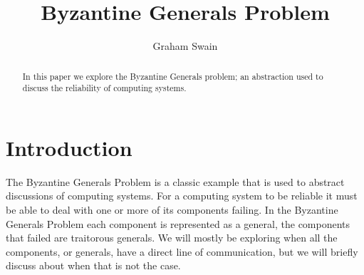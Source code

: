 \documentclass[10pt]{amsart}
\begin{document}
\parskip10pt
\parindent12pt
\baselineskip16pt


\def\G{\widetilde{G}}
\def\B{\widetilde{B}}
\def\T{\widetilde{T}}
\def\C{\mathbb{C}}
\def\A{\mathbb{A}}
\def\Z{\mathbb{Z}}
\def\R{\mathbb{R}}
\def\Q{\mathbb{Q}}
\def\N{\mathbb{N}}
\def\C{\mathbb{C}}
\def\F{\mathbb{F}}
\def\I{\mathbb{I}}
\def\H{\mathcal{H}}
\def\e{\varepsilon}
\def\s{\underline s}
\def\z{\zeta }
\def\vp{\varpi }
\def\O{\mathcal O}
\def\v{\upsilon }
\def\U{\Upsilon }
\def\p{\wp }
\def\p{\mathfrak{p}}
\def\B{\mathfrak{B}}


\newtheorem{theorem}{Theorem}%
\newtheorem{lemma}[theorem]{Lemma}


\title{Byzantine Generals Problem}

\author{Graham Swain}

\begin{abstract}
    In this paper we explore the Byzantine Generals problem; an abstraction used to discuss the
    reliability of computing systems.
\end{abstract}

\maketitle


\section{Introduction}

The Byzantine Generals Problem is a classic example that is used to abstract discussions of
computing systems. For a computing system to be reliable it must be able to deal with one or more
of its components failing. In the Byzantine Generals Problem each component is represented as a
general, the components that failed are traitorous generals. We will mostly be exploring when all the
components, or generals, have a direct line of communication, but we will briefly discuss about when
that is not the case.
\end{document}
